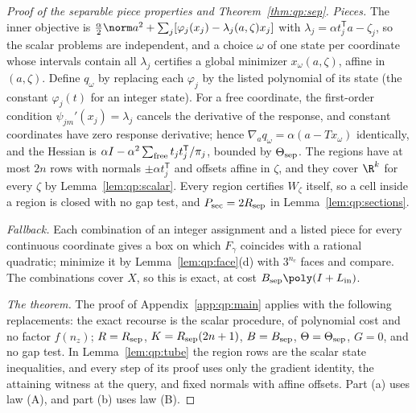 \begin{proof}[Proof of the separable piece properties and Theorem~\ref{thm:qp:sep}]
\emph{Pieces.} The inner objective is
$\frac\alpha2\norm a^2+\sum_j[\varphi_j(x_j)-\lambda_j(a,\zeta)x_j]$ with
$\lambda_j=\alpha t_j^{\mathsf T} a-\zeta_j$, so the scalar problems are independent,
and a choice $\omega$ of one state per coordinate whose intervals contain all
$\lambda_j$ certifies a global minimizer $x_\omega(a,\zeta)$, affine in
$(a,\zeta)$. Define $q_\omega$ by replacing each $\varphi_j$ by the listed
polynomial of its state (the constant $\varphi_j(t)$ for an integer state).
For a free coordinate, the first-order condition $\psi_{jm}'(x_j)=\lambda_j$
cancels the derivative of the response, and constant coordinates have zero
response derivative; hence
$\nabla_aq_\omega=\alpha(a-Tx_\omega)$ identically, and the Hessian is
$\alpha I-\alpha^2\sum_{\rm free}t_jt_j^{\mathsf T}/\pi_j$, bounded by
$\Theta_{\rm sep}$. The regions have at most $2n$ rows with normals
$\pm\alpha t_j^{\mathsf T}$ and offsets affine in $\zeta$, and they cover $\R^k$ for
every $\zeta$ by Lemma~\ref{lem:qp:scalar}. Every region certifies
$W_\zeta$ itself, so a cell inside a region is closed with no gap test, and
$P_{\rm sec}=2R_{\rm sep}$ in Lemma~\ref{lem:qp:sections}.

\emph{Fallback.} Each combination of an integer assignment and a listed piece
for every continuous coordinate gives a box on which $F_\gamma$ coincides with
a rational quadratic; minimize it by Lemma~\ref{lem:qp:face}(d) with $3^{n_c}$
faces and compare. The combinations cover $X$, so this is exact, at cost
$B_{\rm sep}\poly(I+L_{\rm in})$.

\emph{The theorem.} The proof of Appendix~\ref{app:qp:main} applies with the
following replacements: the exact recourse is the scalar procedure, of
polynomial cost and no factor $f(n_z)$; $R=R_{\rm sep}$, $K=R_{\rm sep}(2n+1)$,
$B=B_{\rm sep}$, $\Theta=\Theta_{\rm sep}$, $G=0$, and no gap test. In
Lemma~\ref{lem:qp:tube} the region rows are the scalar state inequalities, and
every step of its proof uses only the gradient identity, the attaining witness
at the query, and fixed normals with affine offsets. Part (a) uses law (A), and
part (b) uses law (B).
\end{proof}

